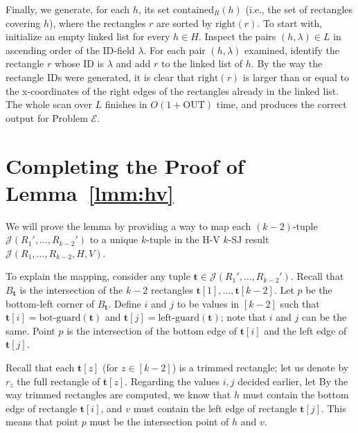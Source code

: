 \documentclass[sigconf]{acmart}
\def\vgap{\vspace{0mm}}
\def\extraspacing{\vspace{1.5mm} \noindent}
\def\J{\mathcal{J}}
\def\xright{\mathrm{right}}
\def\gleft{\mathrm{left\text{-}guard}}
\def\gbot{\mathrm{bot\text{-}guard}}
\def\contained{\mathrm{contained}}
\def\out{\mathrm{OUT}}
\begin{document}
{{{\vgap

Finally, we generate, for each $h$, its set $\contained_R(h)$ (i.e., the set of rectangles covering $h$), where the rectangles $r$ are sorted by $\xright(r)$. To start with, initialize an empty linked list for every $h \in H$. Inspect the pairs $(h, \lambda) \in L$ in ascending order of the ID-field $\lambda$. For each pair $(h, \lambda)$ examined, identify the rectangle $r$ whose ID is $\lambda$ and add $r$ to the linked list of $h$. By the way the rectangle IDs were generated, it is clear that $\xright(r)$ is larger than or equal to the x-coordinates of the right edges of the rectangles already in the linked list. The whole scan over $L$ finishes in $O(1 + \out)$ time, and produces the correct output for Problem $\mathscr{E}$.


\section{Completing the Proof of Lemma~\ref{lmm:hv}} \label{app:hv} 

\extraspacing {\bf Proof of Lemma~\ref{lmm:hv:type1:recur-output}.} We will prove the lemma by providing a way to map each $(k-2)$-tuple $\J(R_1',...,R_{k-2}')$ to a unique $k$-tuple in the H-V $k$-SJ result $\J(R_1,...,R_{k-2},H,V)$.

\vgap

To explain the mapping, consider any tuple $\bm{t} \in \J(R_1',...,R_{k-2}')$. Recall that $B_\bm{t}$ is the intersection of the $k-2$ rectangles $\bm{t}[1], ..., \bm{t}[k-2]$. Let $p$ be the bottom-left corner of $B_\bm{t}$. Define $i$ and $j$ to be values in $[k-2]$ such that $\bm{t}[i] = \gbot(\bm{t})$ and $\bm{t}[j] = \gleft(\bm{t})$; note that $i$ and $j$ can be the same. Point $p$ is the intersection of the bottom edge of $\bm{t}[i]$ and the left edge of $\bm{t}[j]$.

\vgap

Recall that each $\bm{t}[z]$ (for $z \in [k-2]$) is a trimmed rectangle; let us denote by $r_z$ the full rectangle of $\bm{t}[z]$. Regarding the values $i, j$ decided earlier, let
By the way trimmed rectangles are computed, we know that $h$ must contain the bottom edge of rectangle $\bm{t}[i]$, and $v$ must contain the left edge of rectangle $\bm{t}[j]$. This means that point $p$ must be the intersection point of $h$ and $v$.

}}}
\end{document}
